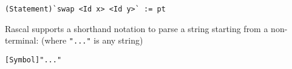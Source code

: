 \begin{lstlisting}[language=rascal]
(Statement)`swap <Id x> <Id y>` := pt
\end{lstlisting}

Rascal supports a shorthand notation to parse a string starting from a non-terminal: (where \lstinline$"..."$ is any string)

\begin{lstlisting}[language=rascal]
[Symbol]"..."
\end{lstlisting}
